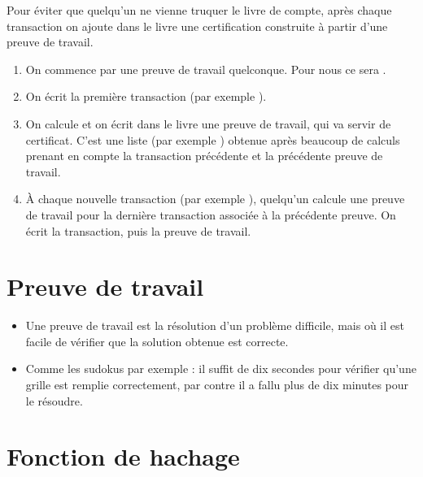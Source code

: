\documentclass[12pt,class=report,crop=false]{standalone}
\begin{document}
Pour éviter que quelqu'un ne vienne truquer le livre de compte, après chaque transaction on ajoute dans le livre une certification construite à partir d'une preuve de travail.
\begin{enumerate}
  \item On commence par une preuve de travail quelconque. Pour nous ce sera 
  \ci{[0,0,0,0,0,0]}.
  \item On écrit la première transaction (par exemple ).
  \item On calcule et on écrit dans le livre une preuve de travail, qui va servir de certificat. C'est une liste
  (par exemple \ci{[56,42,10,98,2,34]}) obtenue après beaucoup de calculs prenant en compte la transaction précédente et la précédente preuve de travail.
  \item À chaque nouvelle transaction (par exemple ), quelqu'un calcule une preuve de travail pour la dernière transaction associée à la précédente preuve. On écrit la transaction, puis la preuve de travail.
\end{enumerate}


\newpage


\section*{Preuve de travail}



\begin{itemize}
   \item Une preuve de travail est la résolution d'un problème difficile, mais où il est facile de vérifier que la solution obtenue est correcte.

  \item Comme les sudokus par exemple : il suffit de dix secondes pour vérifier qu'une grille est remplie correctement, par contre il a fallu plus de dix minutes pour le résoudre.
\end{itemize}


\newpage

\section*{Fonction de hachage}
\end{document}
